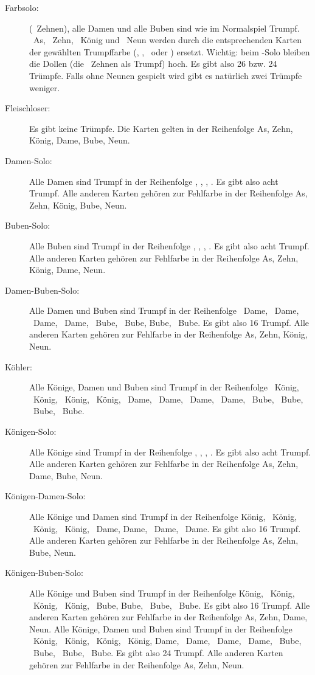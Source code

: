 \documentclass{scrartcl}
\begin{document}
\begin{description}
  \item[Farbsolo:]
    (\Herz\ Zehnen), alle
    Damen und alle Buben sind wie im Normalspiel Trumpf. \Karo\ As,
    \Karo\ Zehn, \Karo\ König und \Karo\ Neun werden durch die
    entsprechenden Karten der gewählten Trumpffarbe (\Kreuz, \Pik,
    \Herz\ oder \Karo) ersetzt. Wichtig: beim \Herz-Solo bleiben die
    Dollen (die \Herz\ Zehnen als Trumpf) hoch. Es gibt also 26 bzw.
    24 Trümpfe. Falls ohne Neunen gespielt wird gibt es natürlich
    zwei Trümpfe weniger.
  \item[Fleischloser:]
    Es gibt keine Trümpfe. Die Karten gelten in der Reihenfolge As,
    Zehn, König, Dame, Bube, Neun.
  \item[Damen-Solo:]
    Alle Damen sind Trumpf in der Reihenfolge \Kreuz, \Pik, \Herz,
    \Karo. Es gibt also acht Trumpf. Alle anderen Karten gehören zur
    Fehlfarbe in der Reihenfolge As, Zehn, König, Bube, Neun.
  \item[Buben-Solo:]
    Alle Buben sind Trumpf in der Reihenfolge \Kreuz, \Pik, \Herz,
    \Karo. Es gibt also acht Trumpf. Alle anderen Karten gehören zur
    Fehlfarbe in der Reihenfolge As, Zehn, König, Dame, Neun.
  \item[Damen-Buben-Solo:]
    Alle Damen und Buben sind Trumpf in der Reihenfolge \Kreuz\ Dame,
    \Pik\ Dame, \Herz\ Dame, \Karo\ Dame, \Kreuz\ Bube, \Pik\ Bube, \Herz
    Bube, \Karo\ Bube. Es gibt also 16 Trumpf. Alle anderen Karten
    gehören zur Fehlfarbe in der Reihenfolge As, Zehn, König, Neun.
  \item[Köhler:]
    Alle Könige, Damen und Buben sind Trumpf in der Reihenfolge
    \Kreuz\ König, \Pik\ König, \Herz\ König, \Karo\ König,
    \Kreuz\ Dame, \Pik\ Dame, \Herz\ Dame, \Karo\ Dame,
    \Kreuz\ Bube, \Pik\ Bube, \Herz\ Bube, \Karo\ Bube.
  \item[Königen-Solo:]
    Alle Könige sind Trumpf in der Reihenfolge \Kreuz, \Pik, \Herz,
    \Karo. Es gibt also acht Trumpf. Alle anderen Karten gehören zur
    Fehlfarbe in der Reihenfolge As, Zehn, Dame, Bube, Neun.
  \item[Königen-Damen-Solo:]
    Alle Könige und Damen sind Trumpf in der Reihenfolge \Kreuz
    König, \Pik\ König, \Herz\ König, \Karo\ König, \Kreuz\ Dame, \Pik
    Dame, \Herz\ Dame, \Karo\ Dame. Es gibt also 16 Trumpf. Alle anderen
    Karten gehören zur Fehlfarbe in der Reihenfolge As, Zehn, Bube,
    Neun.
  \item[Königen-Buben-Solo:]
    Alle Könige und Buben sind Trumpf in der Reihenfolge \Kreuz
    König, \Pik\ König, \Herz\ König, \Karo\ König, \Kreuz\ Bube, \Pik
    Bube, \Herz\ Bube, \Karo\ Bube. Es gibt also 16 Trumpf. Alle anderen
    Karten gehören zur Fehlfarbe in der Reihenfolge As, Zehn, Dame,
    Neun. Alle Könige, Damen und Buben sind Trumpf in der Reihenfolge
    \Kreuz\ König, \Pik\ König, \Herz\ König, \Karo\ König, \Kreuz
    Dame, \Pik\ Dame, \Herz\ Dame, \Karo\ Dame, \Kreuz\ Bube, \Pik\ Bube,
    \Herz\ Bube, \Karo\ Bube. Es gibt also 24 Trumpf. Alle anderen
    Karten gehören zur Fehlfarbe in der Reihenfolge As, Zehn, Neun.
\end{description}
\end{document}
